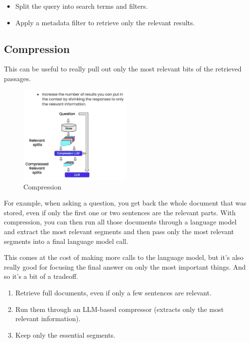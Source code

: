 \documentclass{article}
\begin{document}
\begin{itemize}
    \item Split the query into search terms and filters.
    \item Apply a metadata filter to retrieve only the relevant results.
\end{itemize}

\subsection{Compression}

This can be useful to really pull out only the most relevant bits of the retrieved passages.

\begin{figure}[H]
    \centering
    \includegraphics[width=0.5\textwidth]{images/langchain_chat_with_your_data_016.png}
    \caption{Compression}
    \label{fig:compression}
\end{figure}

For example, when asking a question, you get back the whole document that was stored, even if only the first one or two sentences are the relevant parts. With compression, you can then run all those documents through a language model and extract the most relevant segments and then pass only the most relevant segments into a final language model call.

This comes at the cost of making more calls to the language model, but it's also really good for focusing the final answer on only the most important things. And so it's a bit of a tradeoff.

\begin{enumerate}
    \item Retrieve full documents, even if only a few sentences are relevant.
    \item Run them through an LLM-based compressor (extracts only the most relevant information).
    \item Keep only the essential segments.
\end{enumerate}
\end{document}
